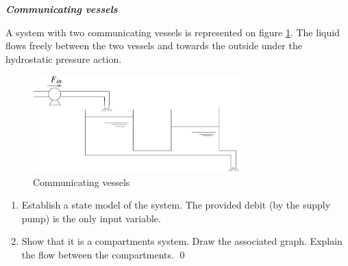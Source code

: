 \begin{exercice}{\bf \em Communicating vessels}

A system with two communicating vessels is represented on figure \ref{Fig:reservoircom}.
The liquid flows freely between the two vessels and towards the outside under the hydrostatic pressure action.

\begin{figure}[h]
\begin{center}
\includegraphics[width=8cm]{images/reservoircom}
\caption{Communicating vessels}
\label{Fig:reservoircom}
\end{center} 
\end{figure}

\begin{enumerate}
\item Establish a state model of the system. The provided debit (by the supply pump) is the only input variable. 
\item Show that it is a compartments system. Draw the associated graph. Explain the flow between the compartments. \qed
\end{enumerate}
\end{exercice}



